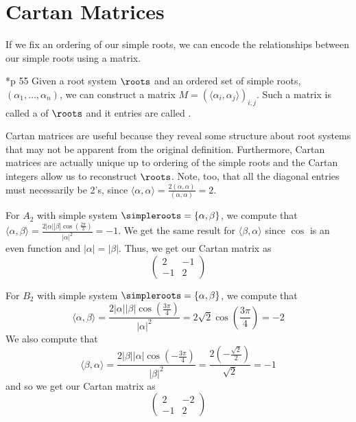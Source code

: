 \documentclass[11pt,leqno,oneside]{amsart}
\numberwithin{thm}{section}
\begin{document}
\section{Cartan Matrices}
If we fix an ordering of our simple roots, we can encode the
relationships between our simple roots using a matrix.
\begin{defn}\cite{humph}*{p 55}
  Given a root system \(\roots\) and an ordered set of simple roots,
  \((\alpha_1, \ldots, 
  \alpha_n)\), we can construct a matrix \(M = (\langle
  \alpha_i,\alpha_j \rangle)_{i,j}\). Such a matrix is called a
   of \(\roots\) and it entries are called .
\end{defn}
Cartan matrices are useful because they reveal some structure about
root systems that may not be apparent from the original
definition. Furthermore, Cartan matrices are actually unique up to
ordering of the simple roots and the Cartan integers allow us to
reconstruct \(\roots\). Note, too, that all the diagonal entries must
necessarily be 2's, since \(\langle \alpha, \alpha \rangle =
\frac{2(\alpha,\alpha)}{(\alpha,\alpha)} = 2\).
\begin{example}
  For \(A_2\) with simple system \(\simpleroots = \{\alpha,\beta\}\), we
  compute that \(\langle \alpha,\beta \rangle = \frac{2
    |\alpha||\beta|\cos(\frac{2\pi}{3})}{|\alpha|^2} = -1\). We get
  the same result for \(\langle \beta,\alpha \rangle\) since \(\cos\)
  is an even function and \(|\alpha| = |\beta|\). Thus, we get our
  Cartan matrix as \[
    \left(
      \begin{array}{cc}
        2&-1\\
        -1&2
      \end{array}
\right)
  \]
\end{example}
\begin{example}
  For \(B_2\) with simple system \(\simpleroots = \{\alpha,\beta\}\), we
  compute that \[\langle  \alpha,\beta \rangle =
  \frac{2|\alpha||\beta|\cos(\frac{3\pi}{4})}{|\alpha|^2} =
  2 \sqrt{2} \cos(\frac{3\pi}{4}) = -2\] We also compute that \[
  \langle \beta,\alpha \rangle = \frac{2|\beta||\alpha|
    \cos(-\frac{3\pi}{4})}{|\beta|^2} = \frac{2
    (-\frac{\sqrt{2}}{2})}{\sqrt{2}} = -1
  \]
  and so we get our Cartan matrix as \[
    \left(
      \begin{array}{cc}
        2&-2\\
        -1&2
      \end{array}
\right)
  \]
\end{example}
\end{document}
